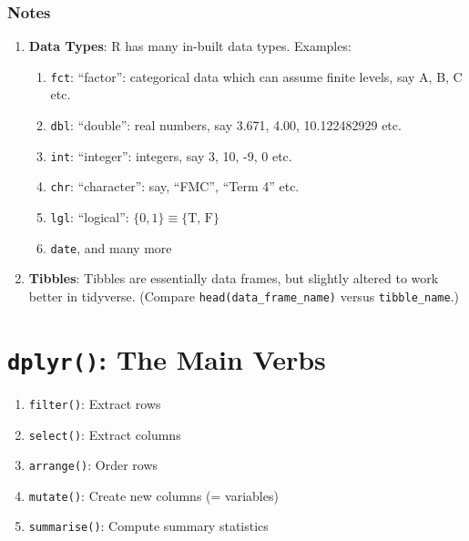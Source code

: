 \documentclass[11pt,]{article}
\providecommand{\tightlist}{%
  \setlength{\itemsep}{0pt}\setlength{\parskip}{0pt}}
\begin{document}
\subsubsection{Notes}\label{notes}

\begin{enumerate}
\def\labelenumi{\arabic{enumi}.}
\tightlist
\item
  \textbf{Data Types}: R has many in-built data types. Examples:

  \begin{enumerate}
  \def\labelenumii{\roman{enumii}.}
  \tightlist
  \item
    \texttt{fct}: ``factor'': categorical data which can assume finite
    levels, say A, B, C etc.
  \item
    \texttt{dbl}: ``double'': real numbers, say 3.671, 4.00,
    10.122482929 etc.
  \item
    \texttt{int}: ``integer'': integers, say 3, 10, -9, 0 etc.
  \item
    \texttt{chr}: ``character'': say, ``FMC'', ``Term 4'' etc.
  \item
    \texttt{lgl}: ``logical'': \(\{0, 1\}\equiv \{\text{T, F}\}\)
  \item
    \texttt{date}, and many more
  \end{enumerate}
\item
  \textbf{Tibbles}: Tibbles are essentially data frames, but slightly
  altered to work better in tidyverse. (Compare
  \texttt{head(data\_frame\_name)} versus \texttt{tibble\_name}.)
\end{enumerate}

\section{\texorpdfstring{\texttt{dplyr()}: The Main
Verbs}{dplyr(): The Main Verbs}}\label{dplyr-the-main-verbs}

\begin{enumerate}
\def\labelenumi{\arabic{enumi}.}
\tightlist
\item
  \texttt{filter()}: Extract rows
\item
  \texttt{select()}: Extract columns
\item
  \texttt{arrange()}: Order rows
\item
  \texttt{mutate()}: Create new columns (= variables)
\item
  \texttt{summarise()}: Compute summary statistics
\end{enumerate}
\end{document}
